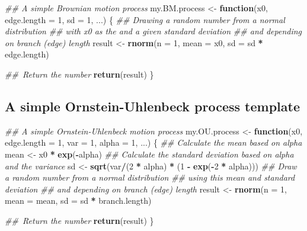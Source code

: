 \documentclass[]{book}
\newenvironment{Shaded}{\begin{snugshade}}{\end{snugshade}}
\newcommand{\CommentTok}[1]{\textcolor[rgb]{0.56,0.35,0.01}{\textit{#1}}}
\newcommand{\ControlFlowTok}[1]{\textcolor[rgb]{0.13,0.29,0.53}{\textbf{#1}}}
\newcommand{\DataTypeTok}[1]{\textcolor[rgb]{0.13,0.29,0.53}{#1}}
\newcommand{\DecValTok}[1]{\textcolor[rgb]{0.00,0.00,0.81}{#1}}
\newcommand{\KeywordTok}[1]{\textcolor[rgb]{0.13,0.29,0.53}{\textbf{#1}}}
\newcommand{\NormalTok}[1]{#1}
\newcommand{\OperatorTok}[1]{\textcolor[rgb]{0.81,0.36,0.00}{\textbf{#1}}}
\newcommand{\StringTok}[1]{\textcolor[rgb]{0.31,0.60,0.02}{#1}}
\begin{document}
\begin{Shaded}
\begin{Highlighting}[]
\CommentTok{## A simple Brownian motion process}
\NormalTok{my.BM.process <-}\StringTok{ }\ControlFlowTok{function}\NormalTok{(x0, }\DataTypeTok{edge.length =} \DecValTok{1}\NormalTok{, }\DataTypeTok{sd =} \DecValTok{1}\NormalTok{, ...) \{}
    \CommentTok{## Drawing a random number from a normal distribution}
    \CommentTok{## with x0 as the and a given standard deviation}
    \CommentTok{## and depending on branch (edge) length}
\NormalTok{    result <-}\StringTok{ }\KeywordTok{rnorm}\NormalTok{(}\DataTypeTok{n =} \DecValTok{1}\NormalTok{, }\DataTypeTok{mean =}\NormalTok{ x0, }\DataTypeTok{sd =}\NormalTok{ sd }\OperatorTok{*}\StringTok{ }\NormalTok{edge.length)}

    \CommentTok{## Return the number}
    \KeywordTok{return}\NormalTok{(result)}
\NormalTok{\}}
\end{Highlighting}
\end{Shaded}

\hypertarget{a-simple-ornstein-uhlenbeck-process-template}{%
\subsection{A simple Ornstein-Uhlenbeck process template}\label{a-simple-ornstein-uhlenbeck-process-template}}

\begin{Shaded}
\begin{Highlighting}[]
\CommentTok{## A simple Ornstein-Uhlenbeck motion process}
\NormalTok{my.OU.process <-}\StringTok{ }\ControlFlowTok{function}\NormalTok{(x0, }\DataTypeTok{edge.length =} \DecValTok{1}\NormalTok{, }\DataTypeTok{var =} \DecValTok{1}\NormalTok{, }\DataTypeTok{alpha =} \DecValTok{1}\NormalTok{, ...) \{}
    \CommentTok{## Calculate the mean based on alpha}
\NormalTok{    mean <-}\StringTok{ }\NormalTok{x0 }\OperatorTok{*}\StringTok{ }\KeywordTok{exp}\NormalTok{(}\OperatorTok{-}\NormalTok{alpha)}
    \CommentTok{## Calculate the standard deviation based on alpha and the variance}
\NormalTok{    sd <-}\StringTok{ }\KeywordTok{sqrt}\NormalTok{(var}\OperatorTok{/}\NormalTok{(}\DecValTok{2} \OperatorTok{*}\StringTok{ }\NormalTok{alpha) }\OperatorTok{*}\StringTok{ }\NormalTok{(}\DecValTok{1} \OperatorTok{-}\StringTok{ }\KeywordTok{exp}\NormalTok{(}\OperatorTok{-}\DecValTok{2} \OperatorTok{*}\StringTok{ }\NormalTok{alpha)))}
    \CommentTok{## Draw a random number from a normal distribution}
    \CommentTok{## using this mean and standard deviation}
    \CommentTok{## and depending on branch (edge) length}
\NormalTok{    result <-}\StringTok{ }\KeywordTok{rnorm}\NormalTok{(}\DataTypeTok{n =} \DecValTok{1}\NormalTok{, }\DataTypeTok{mean =}\NormalTok{ mean, }\DataTypeTok{sd =}\NormalTok{ sd }\OperatorTok{*}\StringTok{ }\NormalTok{branch.length)}

    \CommentTok{## Return the number}
    \KeywordTok{return}\NormalTok{(result)}
\NormalTok{\}}
\end{Highlighting}
\end{Shaded}
\end{document}
